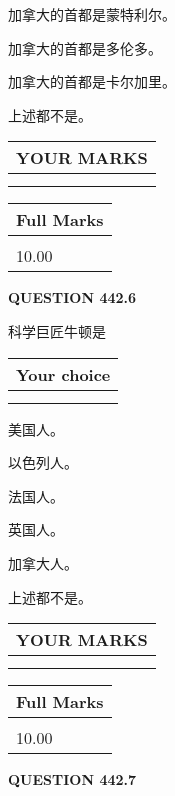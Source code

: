 \documentclass{ctexart}
\begin{document}
 
加拿大的首都是蒙特利尔。
 
 
加拿大的首都是多伦多。
 
 
加拿大的首都是卡尔加里。
 
 
 上述都不是。
 
 
  
\vspace{0.2in}
  
\noindent\begin{tabular}{|l|}
\hline
 YOUR MARKS  \\
\hline
 \\ 
 \\ 
\hline
\end{tabular}
\hspace{0.05in} \begin{tabular}{|l|}
\hline
 Full Marks  \\
\hline
 \\ 
10.00 \\
\hline
\end{tabular}
{\textbf{\Large{QUESTION
442.6 
}}}
  
  
科学巨匠牛顿是
  
  
\noindent\hspace{3.0in} \begin{tabular}{|l|}
\hline
Your choice \\
\hline
 \\ 
 \\ 
\hline
\end{tabular}
  
  
 
 
美国人。
 
 
以色列人。
 
 
法国人。
 
 
英国人。
 
 
加拿大人。
 
 
 上述都不是。
 
 
  
\vspace{0.2in}
  
\noindent\begin{tabular}{|l|}
\hline
 YOUR MARKS  \\
\hline
 \\ 
 \\ 
\hline
\end{tabular}
\hspace{0.05in} \begin{tabular}{|l|}
\hline
 Full Marks  \\
\hline
 \\ 
10.00 \\
\hline
\end{tabular}
{\textbf{\Large{QUESTION
442.7 
}}}
  
\end{document}
